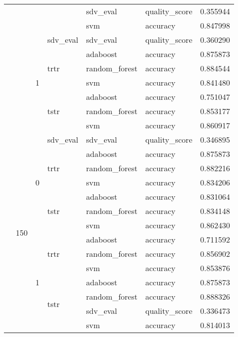 \begin{longtable}{llllllr}
\cline{5-7}
 &  &  &  & sdv_eval & quality_score & 0.355944 \\
\cline{5-7}
 &  &  &  & svm & accuracy & 0.847998 \\
\cline{3-7} \cline{4-7} \cline{5-7}
 &  & \multirow[t]{7}{*}{1} & sdv_eval & sdv_eval & quality_score & 0.360290 \\
\cline{4-7} \cline{5-7}
 &  &  & \multirow[t]{3}{*}{trtr} & adaboost & accuracy & 0.875873 \\
\cline{5-7}
 &  &  &  & random_forest & accuracy & 0.884544 \\
\cline{5-7}
 &  &  &  & svm & accuracy & 0.841480 \\
\cline{4-7} \cline{5-7}
 &  &  & \multirow[t]{3}{*}{tstr} & adaboost & accuracy & 0.751047 \\
\cline{5-7}
 &  &  &  & random_forest & accuracy & 0.853177 \\
\cline{5-7}
 &  &  &  & svm & accuracy & 0.860917 \\
\cline{2-7} \cline{3-7} \cline{4-7} \cline{5-7}
 & \multirow[t]{14}{*}{150} & \multirow[t]{7}{*}{0} & sdv_eval & sdv_eval & quality_score & 0.346895 \\
\cline{4-7} \cline{5-7}
 &  &  & \multirow[t]{3}{*}{trtr} & adaboost & accuracy & 0.875873 \\
\cline{5-7}
 &  &  &  & random_forest & accuracy & 0.882216 \\
\cline{5-7}
 &  &  &  & svm & accuracy & 0.834206 \\
\cline{4-7} \cline{5-7}
 &  &  & \multirow[t]{3}{*}{tstr} & adaboost & accuracy & 0.831064 \\
\cline{5-7}
 &  &  &  & random_forest & accuracy & 0.834148 \\
\cline{5-7}
 &  &  &  & svm & accuracy & 0.862430 \\
\cline{3-7} \cline{4-7} \cline{5-7}
 &  & \multirow[t]{7}{*}{1} & \multirow[t]{3}{*}{trtr} & adaboost & accuracy & 0.711592 \\
\cline{5-7}
 &  &  &  & random_forest & accuracy & 0.856902 \\
\cline{5-7}
 &  &  &  & svm & accuracy & 0.853876 \\
\cline{4-7} \cline{5-7}
 &  &  & \multirow[t]{4}{*}{tstr} & adaboost & accuracy & 0.875873 \\
\cline{5-7}
 &  &  &  & random_forest & accuracy & 0.888326 \\
\cline{5-7}
 &  &  &  & sdv_eval & quality_score & 0.336473 \\
\cline{5-7}
 &  &  &  & svm & accuracy & 0.814013 \\
\cline{1-7} \cline{2-7} \cline{3-7} \cline{4-7} \cline{5-7}
\end{longtable}
